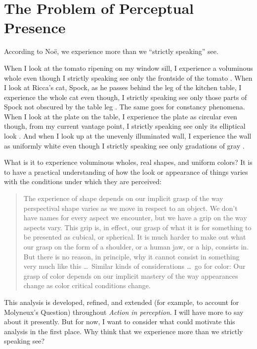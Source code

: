 \documentclass[12pt]{article}
\begin{document}

\section{The Problem of Perceptual Presence}\label{sec:the_problem_of_perceptual_presence} %

According to Noë, we experience more than we ``strictly speaking'' see. 

When I look at the tomato ripening on my window sill, I experience a voluminous whole even though I strictly speaking see only the frontside of the tomato \citep[76]{Noe:2004fk}. When I look at Ricca's cat, Spock, as he passes behind the leg of the kitchen table, I experience the whole cat even though, I strictly speaking see only those parts of Spock not obscured by the table leg \citep[60]{Noe:2004fk}. The same goes for constancy phenomena. When I look at the plate on the table, I experience the plate as circular even though, from my current vantage point, I strictly speaking see only its elliptical look \citep[78--79]{Noe:2004fk}. And when I look up at the unevenly illuminated wall, I experience the wall as uniformly white even though I strictly speaking see only gradations of gray \citep[127]{Noe:2004fk}. 


What is it to experience voluminous wholes, real shapes, and uniform colors? It is to have a practical understanding of how the look or appearance of things varies with the conditions under which they are perceived:
	\begin{quote}
		The experience of shape depends on our implicit grasp of the way perspectival shape varies as we move in respect to an object. We don’t have names for every aspect we encounter, but we have a grip on the way aspects vary. This grip is, in effect, our grasp of what it is for something to be presented as cubical, or spherical. It is much harder to make out what our grasp on the form of a shoulder, or a human jaw, or a hip, consists in. But there is no reason, in principle, why it cannot consist in something very much like this \ldots\ Similar kinds of considerations \ldots\ go for color: Our grasp of color depends on our implicit mastery of the way appearances change as color critical conditions change. \citep[198--199]{Noe:2004fk}
	\end{quote}
This analysis is developed, refined, and extended (for example, to account for Molyneux's Question) throughout \emph{Action in perception}. I will have more to say about it presently. But for now, I want to consider what could motivate this analysis in the first place. Why think that we experience more than we strictly speaking see?
\end{document}
